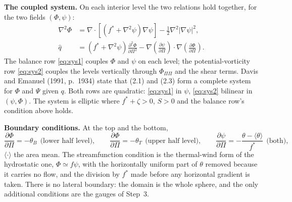 \documentclass[11pt,a4paper]{article}
\newcommand{\dd}[2]{\frac{\partial #1}{\partial #2}}
\newcommand{\ddd}[2]{\frac{\partial^2 #1}{\partial #2^2}}
\newcommand{\lap}{\nabla^2}
\newcommand{\grad}{\nabla}
\begin{document}
\textbf{The coupled system.} On each interior level the two relations hold
together, for the two fields $(\Phi,\psi)$:
\begin{align}
\lap\Phi &= \grad\cdot\left[\left(f^{*}+\lap\psi\right)\grad\psi\right]
 - \tfrac12\lap\left|\grad\psi\right|^2 ,
\label{eq:sys1}\\[1mm]
\hat q &= \left(f^{*}+\lap\psi\right)\ddd{\Phi}{\Pi}
 - \grad\!\left(\dd{\psi}{\Pi}\right)\cdot\grad\!\left(\dd{\Phi}{\Pi}\right) .
\label{eq:sys2}
\end{align}
The balance row \eqref{eq:sys1} couples $\Phi$ and $\psi$ on each level; the
potential-vorticity row \eqref{eq:sys2} couples the levels vertically through
$\Phi_{\Pi\Pi}$ and the shear terms. Davis and Emanuel (1991, p.~1934) state
that (2.1) and (2.3) form a complete system for $\Phi$ and $\Psi$ given $q$.
Both rows are quadratic: \eqref{eq:sys1} in $\psi$, \eqref{eq:sys2} bilinear in
$(\psi,\Phi)$. The system is elliptic where $f^{*}+\zeta>0$, $S>0$ and the
balance row's condition above holds.

\textbf{Boundary conditions.} At the top and the bottom,
\begin{equation}
\dd{\Phi}{\Pi} = -\theta_B \ \ \text{(lower half level)},
\qquad
\dd{\Phi}{\Pi} = -\theta_T \ \ \text{(upper half level)},
\qquad
\dd{\psi}{\Pi} = -\frac{\theta-\langle\theta\rangle}{f^{*}} \ \ \text{(both)},
\label{eq:bc}
\end{equation}
$\langle\cdot\rangle$ the area mean. The streamfunction condition is the
thermal-wind form of the hydrostatic one, $\Phi\simeq f\psi$, with the
horizontally uniform part of $\theta$ removed because it carries no flow, and
the division by $f^{*}$ made before any horizontal gradient is taken. There is
no lateral boundary: the domain is the whole sphere, and the only additional
conditions are the gauges of Step~3.
\end{document}
